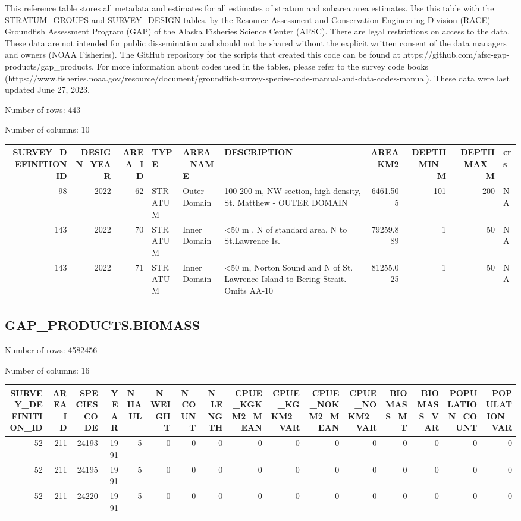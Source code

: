 \documentclass[
  letterpaper,
  oneside,
  open=any]{scrbook}
\begin{document}
This reference table stores all metadata and estimates for all estimates
of stratum and subarea area estimates. Use this table with the
STRATUM\_GROUPS and SURVEY\_DESIGN tables. by the Resource Assessment
and Conservation Engineering Division (RACE) Groundfish Assessment
Program (GAP) of the Alaska Fisheries Science Center (AFSC). There are
legal restrictions on access to the data. These data are not intended
for public dissemination and should not be shared without the explicit
written consent of the data managers and owners (NOAA Fisheries). The
GitHub repository for the scripts that created this code can be found at
https://github.com/afsc-gap-products/gap\_products. For more information
about codes used in the tables, please refer to the survey code books
(https://www.fisheries.noaa.gov/resource/document/groundfish-survey-species-code-manual-and-data-codes-manual).
These data were last updated June 27, 2023.

Number of rows: 443

Number of columns: 10

\begin{tabular}{r|r|r|l|l|l|r|r|r|l}
\hline
SURVEY\_DEFINITION\_ID & DESIGN\_YEAR & AREA\_ID & TYPE & AREA\_NAME & DESCRIPTION & AREA\_KM2 & DEPTH\_MIN\_M & DEPTH\_MAX\_M & crs\\
\hline
98 & 2022 & 62 & STRATUM & Outer Domain & 100-200 m, NW section, high density, St. Matthew - OUTER DOMAIN & 6461.505 & 101 & 200 & NA\\
\hline
143 & 2022 & 70 & STRATUM & Inner Domain & <50 m , N of standard area, N to St.Lawrence Is. & 79259.889 & 1 & 50 & NA\\
\hline
143 & 2022 & 71 & STRATUM & Inner Domain & <50 m, Norton Sound and N of St. Lawrence Island to Bering Strait. Omits AA-10 & 81255.025 & 1 & 50 & NA\\
\hline
\end{tabular}

\hypertarget{gap_products.biomass-1}{%
\subsection{GAP\_PRODUCTS.BIOMASS}\label{gap_products.biomass-1}}

Number of rows: 4582456

Number of columns: 16

\begin{tabular}{r|r|r|r|r|r|r|r|r|r|r|r|r|r|r|r}
\hline
SURVEY\_DEFINITION\_ID & AREA\_ID & SPECIES\_CODE & YEAR & N\_HAUL & N\_WEIGHT & N\_COUNT & N\_LENGTH & CPUE\_KGKM2\_MEAN & CPUE\_KGKM2\_VAR & CPUE\_NOKM2\_MEAN & CPUE\_NOKM2\_VAR & BIOMASS\_MT & BIOMASS\_VAR & POPULATION\_COUNT & POPULATION\_VAR\\
\hline
52 & 211 & 24193 & 1991 & 5 & 0 & 0 & 0 & 0 & 0 & 0 & 0 & 0 & 0 & 0 & 0\\
\hline
52 & 211 & 24195 & 1991 & 5 & 0 & 0 & 0 & 0 & 0 & 0 & 0 & 0 & 0 & 0 & 0\\
\hline
52 & 211 & 24220 & 1991 & 5 & 0 & 0 & 0 & 0 & 0 & 0 & 0 & 0 & 0 & 0 & 0\\
\hline
\end{tabular}
\end{document}
